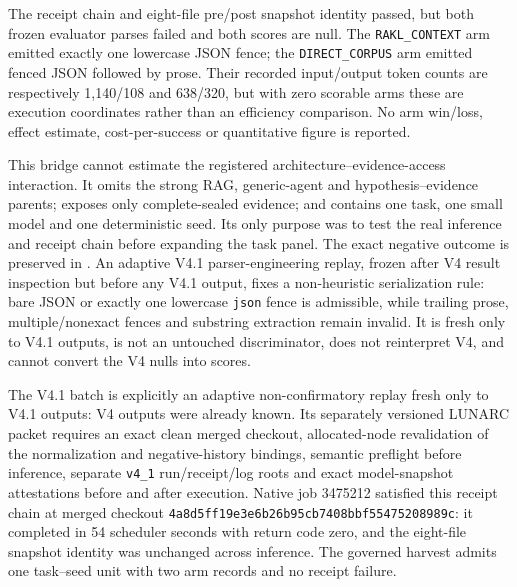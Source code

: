 The receipt chain and eight-file pre/post snapshot identity passed, but both
frozen evaluator parses failed and both scores are null.  The
\texttt{RAKL\_CONTEXT} arm emitted exactly one lowercase JSON fence; the
\texttt{DIRECT\_CORPUS} arm emitted fenced JSON followed by prose.  Their
recorded input/output token counts are respectively 1,140/108 and 638/320, but
with zero scorable arms these are execution coordinates rather than an
efficiency comparison.  No arm win/loss, effect estimate, cost-per-success or
quantitative figure is reported.

This bridge cannot estimate the registered architecture--evidence-access
interaction.  It omits the strong RAG, generic-agent and hypothesis--evidence
parents; exposes only complete-sealed evidence; and contains one task, one small
model and one deterministic seed.  Its only purpose was to test the real
inference and receipt chain before expanding the task panel.  The exact negative
outcome is preserved in
.
An adaptive V4.1 parser-engineering replay, frozen after V4 result inspection
but before any V4.1 output, fixes a non-heuristic serialization rule:
bare JSON or exactly one lowercase \texttt{json} fence is admissible, while
trailing prose, multiple/nonexact fences and substring extraction remain invalid.
It is fresh only to V4.1 outputs, is not an untouched discriminator, does not
reinterpret V4, and cannot convert the V4 nulls into scores.

The V4.1 batch is explicitly an adaptive non-confirmatory replay fresh only to
V4.1 outputs: V4 outputs were already known.  Its separately versioned LUNARC
packet requires an exact clean merged checkout, allocated-node revalidation of
the normalization and negative-history bindings, semantic preflight before
inference, separate \texttt{v4\_1} run/receipt/log roots and exact model-snapshot
attestations before and after execution.  Native job 3475212 satisfied this
receipt chain at merged checkout
\texttt{4a8d5ff19e3e6b26b95cb7408bbf55475208989c}: it completed in 54
scheduler seconds with return code zero, and the eight-file snapshot identity
was unchanged across inference.  The governed harvest admits one task--seed
unit with two arm records and no receipt failure.

